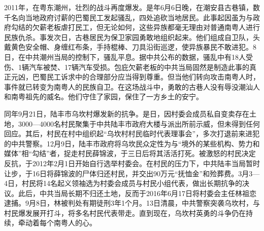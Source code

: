 2011年，在粤东潮州，壮烈的战斗再度爆发。是年6月6日晚，在潮安县古巷镇，数千名向当地政府讨薪的巴蜀民工发起骚乱，四处追砍当地居民。此事起因虽为与政府勾结的欠薪老板虐打民工，但无论如何，这些异族都毫无理由对普通南粤人进行民族仇杀。事发次日，古巷居民为保卫家园勇敢地组织起来。他们组成自卫队，头戴黄色安全帽、身缠红布条，手持棍棒、刀具沿街巡逻，使异族暴民不敢进犯。8日，在中共潮州当局的控制下，骚乱平息。据中共公布的数据，骚乱中有18人受伤、1辆汽车被焚、17辆汽车受损。包庇欠薪老板的中共当局固然是制造此事的真正元凶，巴蜀民工诉求中的合理部分应当得到尊重。但当他们转向攻击南粤人时，事件就已转变为南粤人的民族自卫。在这场战斗中，勇敢的古巷人没有辱没潮汕人和南粤祖先的威名。他们守住了家园，保住了一方乡土的安宁。

同年9月21日，陆丰市乌坎村爆发新的抗争。是日，因村委会成员私自变卖存在土地，3000—4000名村民聚集于中共陆丰市政府大楼与派出所前示威，但未得到任何回应。其后，村民在村中组织起“乌坎村村民临时代表理事会”，多次打退前来进犯的中共警察。12月9日，陆丰市政府将乌坎民众定性为与“境外的某些机构、势力和媒体”相“勾结”者，捉走村民薛锦波，于三日后将其活活打死。被激怒的村民决定反抗，于2012年2月1日开始自行选举村委会。在村民的压力下，中共陆丰当局暂时让步，于16日将薛锦波的尸体归还村民，并交出90万元“抚恤金”和殓葬费。3月3—4日，村民将14名起义领袖选为村委会成员与村民小组代表，做出长期抗争的决议。此后，中共当局长期不归还土地，反而于2016年6月17日将村委会主任林祖恋逮捕。9月8日，林被判处有期徒刑3年1个月。13日清晨，中共警察突袭乌坎村，与村民爆发展开打斗，将多名村民代表带走。直到现在，乌坎村英勇的斗争仍在持续，牵动着每个南粤人的心。

